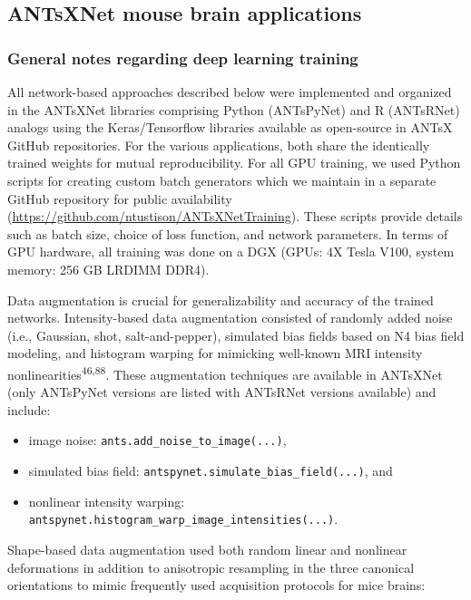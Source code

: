 \documentclass[
  12pt,
]{article}
\begin{document}
\subsection{ANTsXNet mouse brain
applications}\label{antsxnet-mouse-brain-applications}

\subsubsection{General notes regarding deep learning
training}\label{general-notes-regarding-deep-learning-training}

All network-based approaches described below were implemented and
organized in the ANTsXNet libraries comprising Python (ANTsPyNet) and R
(ANTsRNet) analogs using the Keras/Tensorflow libraries available as
open-source in ANTsX GitHub repositories. For the various applications,
both share the identically trained weights for mutual reproducibility.
For all GPU training, we used Python scripts for creating custom batch
generators which we maintain in a separate GitHub repository for public
availability (\url{https://github.com/ntustison/ANTsXNetTraining}).
These scripts provide details such as batch size, choice of loss
function, and network parameters. In terms of GPU hardware, all training
was done on a DGX (GPUs: 4X Tesla V100, system memory: 256 GB LRDIMM
DDR4).

Data augmentation is crucial for generalizability and accuracy of the
trained networks. Intensity-based data augmentation consisted of
randomly added noise (i.e., Gaussian, shot, salt-and-pepper), simulated
bias fields based on N4 bias field modeling, and histogram warping for
mimicking well-known MRI intensity
nonlinearities\textsuperscript{46,88}. These augmentation techniques are
available in ANTsXNet (only ANTsPyNet versions are listed with ANTsRNet
versions available) and include:

\begin{itemize}
\item
  image noise: \texttt{ants.add\_noise\_to\_image(...)},
\item
  simulated bias field: \texttt{antspynet.simulate\_bias\_field(...)},
  and
\item
  nonlinear intensity warping:
  \texttt{antspynet.histogram\_warp\_image\_intensities(...)}.
\end{itemize}

Shape-based data augmentation used both random linear and nonlinear
deformations in addition to anisotropic resampling in the three
canonical orientations to mimic frequently used acquisition protocols
for mice brains:
\end{document}
